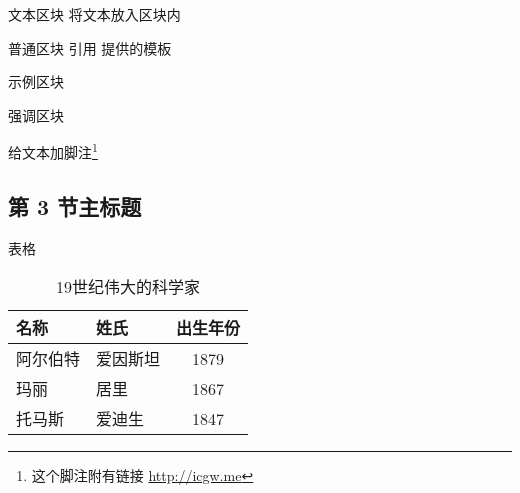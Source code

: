 \documentclass[sans]{beamer}
\begin{document}
\begin{frame}{文本区块}
	将文本放入区块内
	\begin{block}{普通区块}
		引用 \cite{icgw} 提供的模板
	\end{block}
	\begin{exampleblock}{示例区块}
	\end{exampleblock}
	\begin{alertblock}{强调区块}
	\end{alertblock}
	给文本加脚注\footnote{这个脚注附有链接 \url{http://icgw.me}}
\end{frame}


\subsection[第 3 节缩写标题]{第 3 节主标题}

\begin{frame}{表格}
	\begin{table}
		\begin{tabular}{llc}
			名称     & 姓氏     & 出生年份 \\ \midrule
			阿尔伯特 & 爱因斯坦 & 1879     \\
			玛丽     & 居里     & 1867     \\
			托马斯   & 爱迪生   & 1847     \\
		\end{tabular}
		\caption{19世纪伟大的科学家}
	\end{table}
\end{frame}
\end{document}
